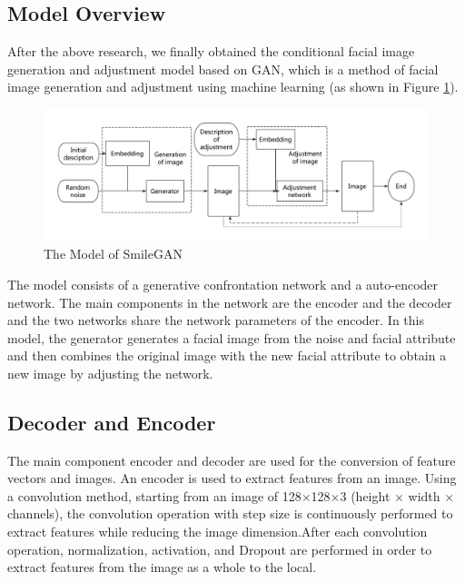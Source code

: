 \subsection{Model Overview}

After the above research, we finally obtained the conditional facial image generation and adjustment model based on GAN,
    which is a method of facial image generation and adjustment using machine learning (as shown in Figure \ref{smliegan}).

\begin{figure}
    \begin{center}
    \includegraphics[width=\textwidth]{figures/model.pdf}
    \caption{The Model of SmileGAN}
    \label{smliegan}
    \end{center}
\end{figure}

The model consists of a generative confrontation network and a auto-encoder network.
The main components in the network are the encoder and the decoder and the two networks share the network parameters of the encoder.
In this model, the generator generates a facial image from the noise and facial attribute and then combines the original image with the new facial attribute to obtain a new image by adjusting the network.


\subsection{Decoder and Encoder}

The main component encoder and decoder are used for the conversion of feature vectors and images.
An encoder is used to extract features from an image.
Using a convolution method, starting from an image of 128×128×3 (height × width × channels),
    the convolution operation with step size is continuously performed to extract features while reducing the image dimension.After each convolution operation,
    normalization, activation, and Dropout are performed in order to extract features from the image as a whole to the local.


